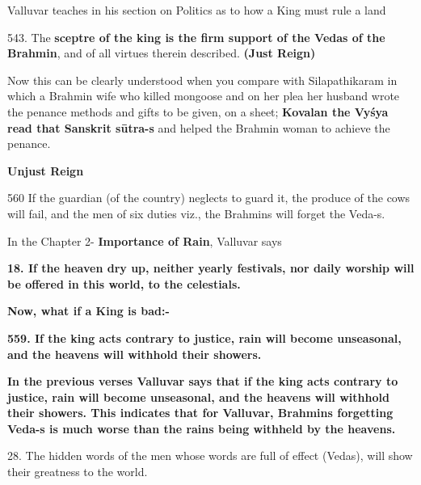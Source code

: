 Valluvar teaches in his section on Politics as to how a King must rule a land

543. The \textbf{sceptre of the king is the firm support of the Vedas of the Brahmin}, and of all virtues therein described. \textbf{(Just Reign)}

Now this can be clearly understood when you compare with Silapathikaram in which a Brahmin wife who killed mongoose and on her plea her husband wrote the penance methods and gifts to be given, on a sheet; \textbf{Kovalan the Vyśya read that Sanskrit sūtra-s} and helped the Brahmin woman to achieve the penance.

\textbf{Unjust Reign}

560  If the guardian (of the country) neglects to guard it, the produce of the cows will fail, and the men of six duties viz., the Brahmins will forget the Veda-s.

In the Chapter 2- \textbf{Importance of Rain}, Valluvar says

\textbf{18. If the heaven dry up, neither yearly festivals, nor daily worship will be offered in this world, to the celestials.}

\textbf{Now, what if a King is bad:-}

\newpage

\textbf{559. If the king acts contrary to justice, rain will become unseasonal, and the heavens will withhold their showers.}

\vskip 2pt

\textbf{In the previous verses Valluvar says that if the king acts contrary to justice, rain will become unseasonal, and the heavens will withhold their showers. This indicates that for Valluvar, Brahmins forgetting Veda-s is much worse than the rains being withheld by the heavens.}

\vskip 2pt

28. The hidden words of the men whose words are full of effect (Vedas), will show their greatness to the world.


